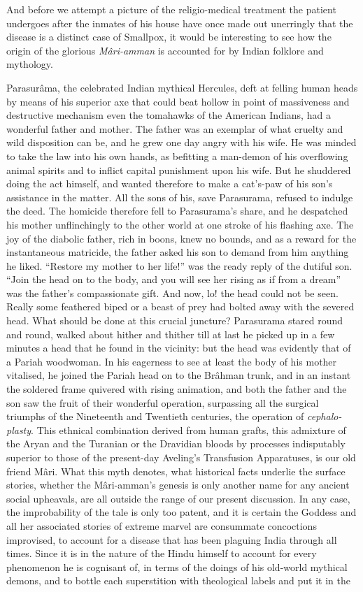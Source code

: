 \documentclass[a4paper, 12pt, oneside, english, twocolumn]{article}
\begin{document}
And before we attempt a picture of the religio-medical treatment the patient undergoes after the inmates of his house have once made out unerringly that the disease is a distinct case of Smallpox, it would be interesting to see how the origin of the glorious \emph{Mâri-amman} is accounted for by Indian folklore and mythology.

Parasurâma, the celebrated Indian mythical Hercules, deft at felling human heads by means of his superior axe that could beat hollow in point of massiveness and destructive mechanism even the tomahawks of the American Indians, had a wonderful father and mother. The father was an exemplar of what cruelty and wild disposition can be, and he grew one day angry with his wife. He was minded to take the law into his own hands, as befitting a man-demon of his overflowing animal spirits and to inflict capital punishment upon his wife. But he shuddered doing the act himself, and wanted therefore to make a cat's-paw of his son's assistance in the matter. All the sons of his, save Parasurama, refused to indulge the deed. The homicide therefore fell to Parasurama's share, and he despatched his mother unflinchingly to the other world at one stroke of his flashing axe. The joy of the diabolic father, rich in boons, knew no bounds, and as a reward for the instantaneous matricide, the father asked his son to demand from him anything he liked. ``Restore my mother to her life!'' was the ready reply of the dutiful son. ``Join the head on to the body, and you will see her rising as if from a dream'' was the father's compassionate gift. And now, lo! the head could not be seen. Really some feathered biped or a beast of prey had bolted away with the severed head. What should be done at this crucial juncture? Parasurama stared round and round, walked about hither and thither till at last he picked up in a few minutes a head that he found in the vicinity: but the head was evidently that of a Pariah woodwoman. In his eagerness to see at least the body of his mother vitalised, he joined the Pariah head on to the Brâhman trunk, and in an instant the soldered frame quivered with rising animation, and both the father and the son saw the fruit of their wonderful operation, surpassing all the surgical triumphs of the Nineteenth and Twentieth centuries, the operation of \emph{cephalo-plasty}. This ethnical combination derived from human grafts, this admixture of the Aryan and the Turanian or the Dravidian bloods by processes indisputably superior to those of the present-day Aveling's Transfusion Apparatuses, is our old friend Mâri. What this myth denotes, what historical facts underlie the surface stories, whether the Mâri-amman's genesis is only another name for any ancient social upheavals, are all outside the range of our present discussion. In any case, the improbability of the tale is only too patent, and it is certain the Goddess and all her associated stories of extreme marvel are consummate concoctions improvised, to account for a disease that has been plaguing India through all times. Since it is in the nature of the Hindu himself to account for every phenomenon he is cognisant of, in terms of the doings of his old-world mythical demons, and to bottle each superstition with theological labels and put it in the 
\end{document}
